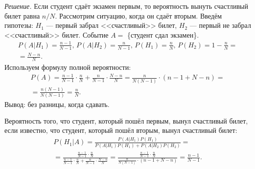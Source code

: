 \textit{Решение.} Если студент сдаёт экзамен первым, то вероятность вынуть счастливый билет равна $n/N$.
Рассмотрим ситуацию, когда он сдаёт вторым.
Введём гипотезы: $H_1$ --- первый забрал <<счастливый>> билет, $H_2$ --- первый не забрал <<счастливый>> билет.
Событие $A =$ \{студент сдал экзамен\}.
\begin{equation*}
\begin{split}
P \left( \left. A \right| H_1 \right) =
\frac{n-1}{N-1}, \,
P \left( \left. A \right| H_2 \right) =
\frac{n}{N-1}, \,
P \left( H_1 \right) =
\frac{n}{N}, \,
P \left( H_2 \right) =
1 - \frac{n}{N} = \\
= \frac{N-n}{N}.
\end{split}
\end{equation*}
Используем формулу полной вероятности:
\begin{equation*}
\begin{split}
P \left( A \right) =
\frac{n-1}{N-1} \cdot \frac{n}{N} + \frac{n}{N-1} \cdot \frac{N-n}{N} =
\frac{n}{N \left( N-1 \right) } \cdot \left( n-1+N-n \right) = \\
= \frac{n \left( N-1 \right) }{N \left( N-1 \right) } =
\frac{n}{N}.
\end{split}
\end{equation*}
Вывод: без разницы, когда сдавать.

Вероятность того, что студент, который пошёл первым, вынул счастливый билет, если известно, что студент, который пошёл вторым, вынул счастливый билет:
\begin{equation*}
\begin{split}
P \left( \left. H_1 \right| A \right) =
\frac{P \left( \left. A \right| H_1 \right) P \left( H_1 \right) }{P \left( \left. A \right| H_1 \right) P \left( H_1 \right) +
P \left( \left. A \right| H_2 \right) P \left( H_2 \right) } = \\
= \frac{ \frac{n-1}{N-1} \cdot \frac{n}{N} }{ \frac{n-1}{N-1} \cdot \frac{n}{N} + \frac{n}{N-1} \cdot \frac{N-n}{N} } =
\frac{ \frac{n-1}{N-1} \cdot \frac{n}{N} }{ \frac{n}{N \left( N-1 \right) } \cdot \left( n-1+N-n \right) } =
\frac{n-1}{N-1}.
\end{split}
\end{equation*}
